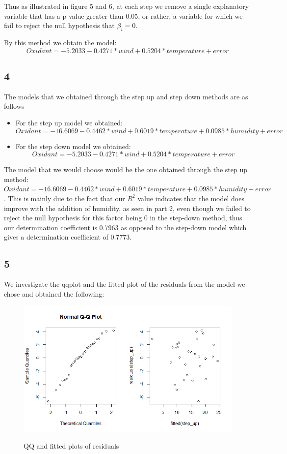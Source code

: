 \documentclass{article}
\begin{document}
 Thus as illustrated in figure 5 and 6, at each step we remove a single explanatory variable that has a p-value greater than 0.05, or rather, a variable for which we fail to reject the null hypothesis that $\beta_i = 0$.
 
 By this method we obtain the model:
 $$Oxidant = -5.2033 -0.4271*wind+0.5204*temperature+error$$
 
    \subsection*{4}
    The models that we obtained through the step up and step down methods are as follows
    \begin{itemize}
    \item For the step up model we obtained:
    $$Oxidant = -16.6069 -0.4462*wind + 0.6019*temperature + 0.0985*humidity+error$$
    \item For the step down model we obtained:
    $$Oxidant = -5.2033 -0.4271*wind+0.5204*temperature+error$$
    \end{itemize}
    
    The model that we would choose would be the one obtained through the step up method: $Oxidant = -16.6069 -0.4462*wind + 0.6019*temperature + 0.0985*humidity+error$. This is mainly due to the fact that our $R^2$ value indicates that the model does improve with the addition of humidity, as seen in part 2, even though we failed to reject the null hypothesis for this factor being 0 in the step-down method, thus our determination coefficient is 0.7963 as opposed to the step-down model which gives a determination coefficient of 0.7773.
    
    \subsection*{5}
    
    We investigate the qqplot and the fitted plot of the residuals from the model we chose and obtained the following:
    
          \begin{figure}[H]
          \centering
          \includegraphics[scale=0.6]{../results/2_5.png}
                    \label{fig:qqresid}
          \caption{QQ and fitted plots of residuals}

      \end{figure} 
    
\end{document}
